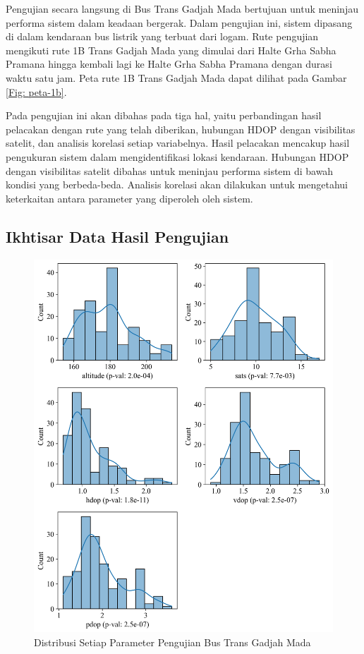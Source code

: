 Pengujian secara langsung di Bus Trans Gadjah Mada bertujuan untuk meninjau performa sistem dalam keadaan bergerak. Dalam pengujian ini, sistem dipasang di dalam kendaraan bus listrik yang terbuat dari logam. Rute pengujian mengikuti rute 1B Trans Gadjah Mada yang dimulai dari Halte Grha Sabha Pramana hingga kembali lagi ke Halte Grha Sabha Pramana dengan durasi waktu satu jam. Peta rute 1B Trans Gadjah Mada dapat dilihat pada Gambar \ref{Fig: peta-1b}.

Pada pengujian ini akan dibahas pada tiga hal, yaitu perbandingan hasil pelacakan dengan rute yang telah diberikan, hubungan HDOP dengan visibilitas satelit, dan analisis korelasi setiap variabelnya. Hasil pelacakan mencakup hasil pengukuran sistem dalam mengidentifikasi lokasi kendaraan. Hubungan HDOP dengan visibilitas satelit dibahas untuk meninjau performa sistem di bawah kondisi yang berbeda-beda. Analisis korelasi akan dilakukan untuk mengetahui keterkaitan antara parameter yang diperoleh oleh sistem.

\subsection{Ikhtisar Data Hasil Pengujian}
\begin{figure}[H]
	\centering
	\includegraphics[width=14cm]{contents/chapter-4/pengujian-bergerak/distribusi.png}
	\caption{Distribusi Setiap Parameter Pengujian Bus Trans Gadjah Mada}
	\label{Fig: moving-distribusi}
\end{figure}

